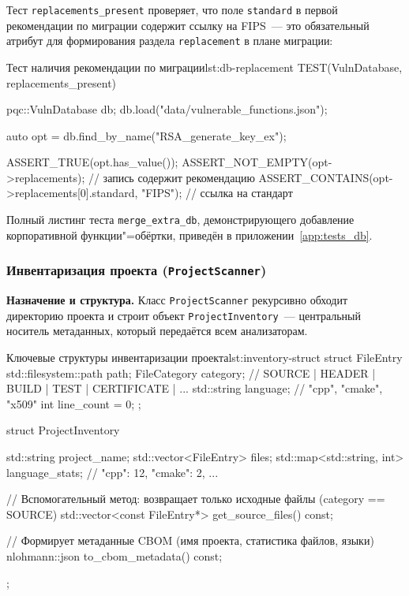 Тест \texttt{replacements\_present} проверяет, что поле
\texttt{standard} в первой рекомендации по миграции содержит ссылку
на FIPS~--- это обязательный атрибут для формирования раздела
\texttt{replacement} в плане миграции:

\begin{itmolisting}[C++]{Тест наличия рекомендации по миграции}{lst:db-replacement}
TEST(VulnDatabase, replacements_present) {
    pqc::VulnDatabase db;
    db.load("data/vulnerable_functions.json");

    auto opt = db.find_by_name("RSA_generate_key_ex");

    ASSERT_TRUE(opt.has_value());
    ASSERT_NOT_EMPTY(opt->replacements);            // запись содержит рекомендацию
    ASSERT_CONTAINS(opt->replacements[0].standard, "FIPS"); // ссылка на стандарт
}
\end{itmolisting}

Полный листинг теста \texttt{merge\_extra\_db}, демонстрирующего
добавление корпоративной функции"=обёртки, приведён в
приложении~\ref{app:tests_db}.

\subsubsection{Инвентаризация проекта (\texttt{ProjectScanner})}

\textbf{Назначение и структура.}
Класс \texttt{ProjectScanner} рекурсивно обходит директорию проекта
и строит объект \texttt{ProjectInventory}~--- центральный
носитель метаданных, который передаётся всем анализаторам.

\begin{itmolisting}[C++]{Ключевые структуры инвентаризации проекта}{lst:inventory-struct}
struct FileEntry {
    std::filesystem::path path;
    FileCategory category; // SOURCE | HEADER | BUILD | TEST | CERTIFICATE | ...
    std::string language;  // "cpp", "cmake", "x509"
    int line_count = 0;
};

struct ProjectInventory {
    std::string project_name;
    std::vector<FileEntry> files;
    std::map<std::string, int> language_stats; // {"cpp": 12, "cmake": 2, ...}

    // Вспомогательный метод: возвращает только исходные файлы (category == SOURCE)
    std::vector<const FileEntry*> get_source_files() const;

    // Формирует метаданные CBOM (имя проекта, статистика файлов, языки)
    nlohmann::json to_cbom_metadata() const;
};
\end{itmolisting}

